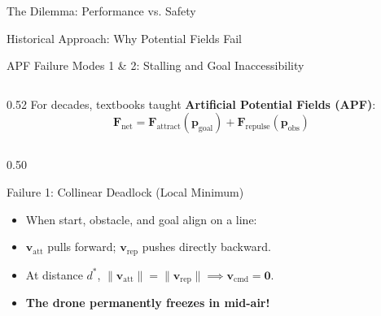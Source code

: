 \documentclass[aspectratio=169,10pt]{beamer}
\begin{document}
\begin{frame}{The Dilemma: Performance vs. Safety}
\begin{frame}{Historical Approach: Why Potential Fields Fail}
\begin{frame}{APF Failure Modes 1 \& 2: Stalling and Goal Inaccessibility}
  \begin{columns}[T]
    \begin{column}{0.52\textwidth}
      For decades, textbooks taught \textbf{Artificial Potential Fields (APF)}:
      $$\mathbf{F}_{\mathrm{net}} = \mathbf{F}_{\mathrm{attract}}(\mathbf{p}_{\mathrm{goal}}) + \mathbf{F}_{\mathrm{repulse}}(\mathbf{p}_{\mathrm{obs}})$$
    \begin{column}{0.50\textwidth}
      \begin{alertblock}{Failure 1: Collinear Deadlock (Local Minimum)}
        \scriptsize
        \begin{itemize}
          \item When start, obstacle, and goal align on a line:
          \item $\mathbf{v}_{\mathrm{att}}$ pulls forward; $\mathbf{v}_{\mathrm{rep}}$ pushes directly backward.
          \item At distance $d^*$, $\|\mathbf{v}_{\mathrm{att}}\| = \|\mathbf{v}_{\mathrm{rep}}\| \implies \mathbf{v}_{\mathrm{cmd}} = \mathbf{0}$.
          \item \textbf{The drone permanently freezes in mid-air!}
        \end{itemize}
      \end{alertblock}


\end{column}
\end{column}
\end{columns}
\end{frame}
\end{frame}
\end{frame}
\end{document}
